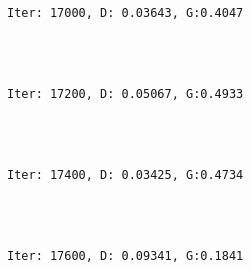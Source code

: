 \documentclass[11pt]{article}
\begin{document}
    \begin{center}
    \end{center}
    { \hspace*{\fill} \\}
    
    \begin{Verbatim}[commandchars=\\\{\}]

Iter: 17000, D: 0.03643, G:0.4047
    \end{Verbatim}

    \begin{center}
    \end{center}
    { \hspace*{\fill} \\}
    
    \begin{Verbatim}[commandchars=\\\{\}]

Iter: 17200, D: 0.05067, G:0.4933
    \end{Verbatim}

    \begin{center}
    \end{center}
    { \hspace*{\fill} \\}
    
    \begin{Verbatim}[commandchars=\\\{\}]

Iter: 17400, D: 0.03425, G:0.4734
    \end{Verbatim}

    \begin{center}
    \end{center}
    { \hspace*{\fill} \\}
    
    \begin{Verbatim}[commandchars=\\\{\}]

Iter: 17600, D: 0.09341, G:0.1841
    \end{Verbatim}

    \begin{center}
    \end{center}
    { \hspace*{\fill} \\}
    
\end{document}

